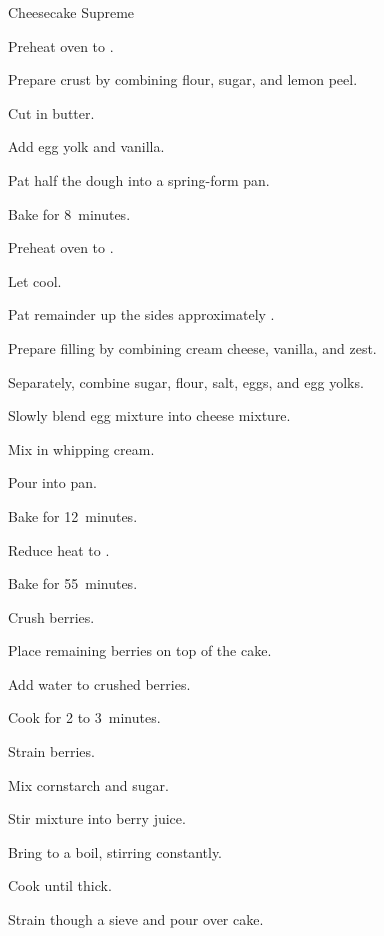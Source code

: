 \begin{recipe}{Cheesecake Supreme}{}{}
\begin{directions}
\item Preheat oven to .
\item Prepare crust by combining flour, sugar, and lemon peel.
\item Cut in butter.
\item Add egg yolk and vanilla.
\item Pat half the dough into a spring-form pan.
\item Bake for 8~minutes.
\item Preheat oven to .
\item Let cool.
\item Pat remainder up the sides approximately \inch{1\half}.
\item Prepare filling by combining cream cheese, vanilla, and zest.
\item Separately, combine sugar, flour, salt, eggs, and egg yolks.
\item Slowly blend egg mixture into cheese mixture.
\item Mix in whipping cream.
\item Pour into pan.
\item Bake for 12~minutes.
\item Reduce heat to .
\item Bake for 55~minutes.
\item Crush  berries.
\item Place remaining berries on top of the cake.
\item Add water to crushed berries.
\item Cook for 2 to 3~minutes.
\item Strain berries.
\item Mix cornstarch and sugar.
\item Stir mixture into berry juice.
\item Bring to a boil, stirring constantly.
\item Cook until thick.
\item Strain though a sieve and pour over cake.
\end{directions}

\end{recipe}
